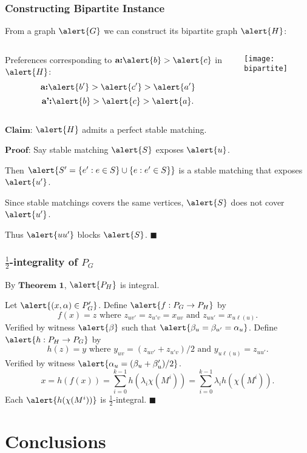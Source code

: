 \documentclass[10pt]{beamer}
\begin{document}
\begin{frame}
\frametitle{Constructing Bipartite Instance}
\begin{center}
From a graph $\alert{G}$ we can construct its bipartite graph $\alert{H}$:
\begin{columns}[T]
\begin{column}{.48\textwidth}
\centering
Preferences corresponding to $\textbf{a:} \alert{b} > \alert{c}$ in $\alert{H}$:
$$\textbf{a:} \alert{b'} > \alert{c'} > \alert{a'}$$
$$\textbf{a':} \alert{b}>\alert{c} > \alert{a}.$$
\end{column}
\begin{column}{.48\textwidth}
\texttt{[image: bipartite]}
\end{column}
\end{columns}
\end{center}
$\textbf{Claim:}$ $\alert{H}$ admits a perfect stable matching. 

$\textbf{Proof:}$ Say stable matching $\alert{S}$ exposes $\alert{u}$.

Then $\alert{S' = \{e' : e\in S\} \cup \{e : e' \in S\}}$ is a stable matching that exposes $\alert{u'}$.

Since stable matchings covers the same vertices, $\alert{S}$ does not cover $\alert{u'}$. 

Thus $\alert{uu'}$ blocks $\alert{S}$. $\blacksquare$
\end{frame}

\begin{frame}
\frametitle{$\frac{1}{2}$-integrality of $P_G$}
By $\textbf{Theorem 1}$, $\alert{P_H}$ is integral.

Let $\alert{(x, \alpha) \in P'_G}$. Define $\alert{f: P_G \rightarrow P_H}$ by
$$f(x) = z \text{ where } z_{uv'}=z_{u'v} =x_{uv} \text{ and } z_{uu'} = x_{u\ell(u)}.$$
Verified by witness $\alert{\beta}$ such that $\alert{\beta_u = \beta_{u'} = \alpha_u}$.
Define $\alert{h: P_H \rightarrow P_G}$ by 
$$h(z) = y \text{ where } y_{uv} = (z_{uv'} + z_{u'v})/2 \text{ and } y_{u\ell(u)} = z_{uu'}.$$
Verified by witness $\alert{\alpha_u = (\beta_u + \beta_u')/2}$.
$$x = h(f(x)) = \sum_{i=0}^{k-1} h(\lambda_i \chi(M^i)) = \sum_{i=0}^{k-1} \lambda_i h(\chi(M^i)).$$
Each $\alert{h(\chi(M^i))}$ is $\frac{1}{2}$-integral. $\blacksquare$
\end{frame}
\section{Conclusions}
\end{document}

